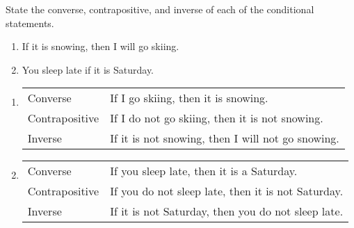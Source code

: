 \documentclass[12pt,addpoints]{exam}
\newcommand{\ra}{\rightarrow}
\begin{document}
\begin{questions}
\question[6] State the converse, contrapositive, and inverse of each of the conditional statements.
    \begin{enumerate}[label=(\alph*),itemsep=0pt,parsep=0pt,topsep=0pt,partopsep=0pt]
        \item If it is snowing, then I will go skiing.
        \item You sleep late if it is Saturday.
    \end{enumerate}
    \ifprintanswers
        \vspace{-10pt}
    \fi
    \begin{solution}
    \begin{enumerate}[label=(\alph*),itemsep=0pt,parsep=0pt,topsep=0pt,partopsep=0pt]
        \item
        \begin{tabular}{ll}
            Converse &  If I go skiing, then it is snowing. \\
            Contrapositive & If I do not go skiing, then it is not snowing. \\
            Inverse &  If it is not snowing, then I will not go snowing.
        \end{tabular}
        \item
        \begin{tabular}{ll}
            Converse &  If you sleep late, then it is a Saturday. \\
            Contrapositive & If you do not sleep late, then it is not Saturday. \\
            Inverse &  If it is not Saturday, then you do not sleep late.
        \end{tabular}
    \end{enumerate}
    \end{solution}


\end{questions}
\end{document}
